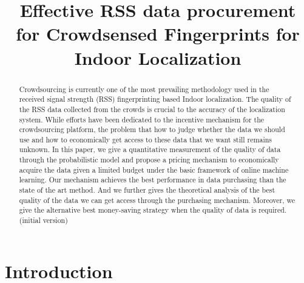 \documentclass[10pt,conference,compsocconf,letterpaper]{IEEEtran}
\begin{document}
\title{Effective RSS data procurement for Crowdsensed Fingerprints for Indoor Localization}

%
%

\maketitle



\begin{abstract}
Crowdsourcing is currently one of the most prevailing methodology used in the received signal strength (RSS) fingerprinting based Indoor localization. The quality of the RSS data collected from the crowds is crucial to the accuracy of the localization system. While efforts have been dedicated to the incentive mechanism for the crowdsourcing platform, the problem that how to judge whether the data we should use and how to economically get access to these data that we want still remains unknown.  In this paper, we give a quantitative measurement of the quality of data through the probabilistic model and propose a pricing mechanism to economically acquire the data given a limited budget under the basic framework of online machine learning. Our mechanism achieves the best performance in data purchasing than the state of the art method. And we further gives the theoretical analysis of the best quality of the data we can get access through the purchasing mechanism. Moreover, we give the alternative best money-saving strategy when the quality of data is required.(initial version)
\end{abstract}


\section{Introduction}\label{sectionintro}
\end{document}

